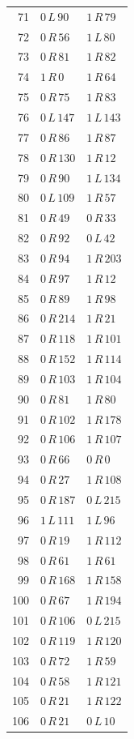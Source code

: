 \begin{longtable}{rll}
71 & $0\,L\,90$ & $1\,R\,79$ \\
72 & $0\,R\,56$ & $1\,L\,80$ \\
73 & $0\,R\,81$ & $1\,R\,82$ \\
74 & $1\,R\,0$ & $1\,R\,64$ \\
75 & $0\,R\,75$ & $1\,R\,83$ \\
76 & $0\,L\,147$ & $1\,L\,143$ \\
77 & $0\,R\,86$ & $1\,R\,87$ \\
78 & $0\,R\,130$ & $1\,R\,12$ \\
79 & $0\,R\,90$ & $1\,L\,134$ \\
80 & $0\,L\,109$ & $1\,R\,57$ \\
81 & $0\,R\,49$ & $0\,R\,33$ \\
82 & $0\,R\,92$ & $0\,L\,42$ \\
83 & $0\,R\,94$ & $1\,R\,203$ \\
84 & $0\,R\,97$ & $1\,R\,12$ \\
85 & $0\,R\,89$ & $1\,R\,98$ \\
86 & $0\,R\,214$ & $1\,R\,21$ \\
87 & $0\,R\,118$ & $1\,R\,101$ \\
88 & $0\,R\,152$ & $1\,R\,114$ \\
89 & $0\,R\,103$ & $1\,R\,104$ \\
90 & $0\,R\,81$ & $1\,R\,80$ \\
91 & $0\,R\,102$ & $1\,R\,178$ \\
92 & $0\,R\,106$ & $1\,R\,107$ \\
93 & $0\,R\,66$ & $0\,R\,0$ \\
94 & $0\,R\,27$ & $1\,R\,108$ \\
95 & $0\,R\,187$ & $0\,L\,215$ \\
96 & $1\,L\,111$ & $1\,L\,96$ \\
97 & $0\,R\,19$ & $1\,R\,112$ \\
98 & $0\,R\,61$ & $1\,R\,61$ \\
99 & $0\,R\,168$ & $1\,R\,158$ \\
100 & $0\,R\,67$ & $1\,R\,194$ \\
101 & $0\,R\,106$ & $0\,L\,215$ \\
102 & $0\,R\,119$ & $1\,R\,120$ \\
103 & $0\,R\,72$ & $1\,R\,59$ \\
104 & $0\,R\,58$ & $1\,R\,121$ \\
105 & $0\,R\,21$ & $1\,R\,122$ \\
106 & $0\,R\,21$ & $0\,L\,10$ \\

\end{longtable}
